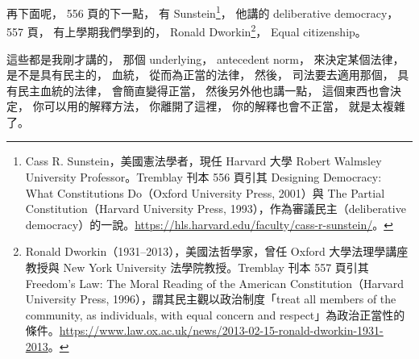 \hypertarget{w02:cue:2763}{}再下面呢，
\hypertarget{w02:cue:2764}{}556 頁的下一點，
\hypertarget{w02:cue:2765}{}有 Sunstein\footnote{Cass R. Sunstein，美國憲法學者，現任 Harvard 大學 Robert Walmsley University Professor。Tremblay 刊本 556 頁引其 Designing Democracy: What Constitutions Do（Oxford University Press, 2001）與 The Partial Constitution（Harvard University Press, 1993），作為審議民主（deliberative democracy）的一說。\url{https://hls.harvard.edu/faculty/cass-r-sunstein/}。}，
\hypertarget{w02:cue:2766}{}他講的 deliberative democracy，
\hypertarget{w02:cue:2767}{}557 頁，
\hypertarget{w02:cue:2768}{}有上學期我們學到的，
\hypertarget{w02:cue:2769}{}Ronald Dworkin\footnote{Ronald Dworkin（1931–2013），美國法哲學家，曾任 Oxford 大學法理學講座教授與 New York University 法學院教授。Tremblay 刊本 557 頁引其 Freedom's Law: The Moral Reading of the American Constitution（Harvard University Press, 1996），謂其民主觀以政治制度「treat all members of the community, as individuals, with equal concern and respect」為政治正當性的條件。\url{https://www.law.ox.ac.uk/news/2013-02-15-ronald-dworkin-1931-2013}。}，
\hypertarget{w02:cue:2770}{}Equal citizenship。

\hypertarget{w02:cue:2771}{}這些都是我剛才講的，
\hypertarget{w02:cue:2772}{}那個 underlying，
\hypertarget{w02:cue:2773}{}antecedent norm，
\hypertarget{w02:cue:2774}{}來決定某個法律，
\hypertarget{w02:cue:2775}{}是不是具有民主的，
\hypertarget{w02:cue:2776}{}血統，
\hypertarget{w02:cue:2777}{}從而為正當的法律，
\hypertarget{w02:cue:2778}{}然後，
\hypertarget{w02:cue:2779}{}司法要去適用那個，
\hypertarget{w02:cue:2780}{}具有民主血統的法律，
\hypertarget{w02:cue:2781}{}會簡直變得正當，
\hypertarget{w02:cue:2782}{}然後另外他也講一點，
\hypertarget{w02:cue:2783}{}這個東西也會決定，
\hypertarget{w02:cue:2784}{}你可以用的解釋方法，
\hypertarget{w02:cue:2785}{}你離開了這裡，
\hypertarget{w02:cue:2786}{}你的解釋也會不正當，
\hypertarget{w02:cue:2787}{}就是太複雜了。

